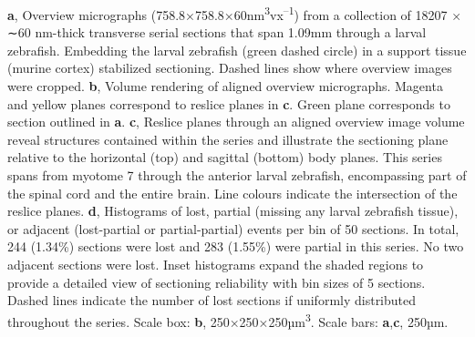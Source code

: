\documentclass{article}
\begin{document}
\noindent\textbf{a}, Overview micrographs (758.8×758.8×60nm\textsuperscript{3}vx\textsuperscript{–1}) from a collection of 18207 × ∼60 nm-thick transverse serial sections that span 1.09mm through a larval zebrafish. Embedding the larval zebrafish (green dashed circle) in a support tissue (murine cortex) stabilized sectioning. Dashed lines show where overview images were cropped. \textbf{b}, Volume rendering of aligned overview micrographs. Magenta and yellow planes correspond to reslice planes in \textbf{c}. Green plane corresponds to section outlined in \textbf{a}. \textbf{c}, Reslice planes through an aligned overview image volume reveal structures contained within the series and illustrate the sectioning plane relative to the horizontal (top) and sagittal (bottom) body planes. This series spans from myotome 7 through the anterior larval zebrafish, encompassing part of the spinal cord and the entire brain. Line colours indicate the intersection of the reslice planes. \textbf{d}, Histograms of lost, partial (missing any larval zebrafish tissue), or adjacent (lost-partial or partial-partial) events per bin of 50 sections. In total, 244 (1.34\%) sections were lost and 283 (1.55\%) were partial in this series. No two adjacent sections were lost. Inset histograms expand the shaded regions to provide a detailed view of sectioning reliability with bin sizes of 5 sections. Dashed lines indicate the number of lost sections if uniformly distributed throughout the series. Scale box: \textbf{b}, 250×250×250µm\textsuperscript{3}. Scale bars: \textbf{a},\textbf{c}, 250µm.
\end{document}
